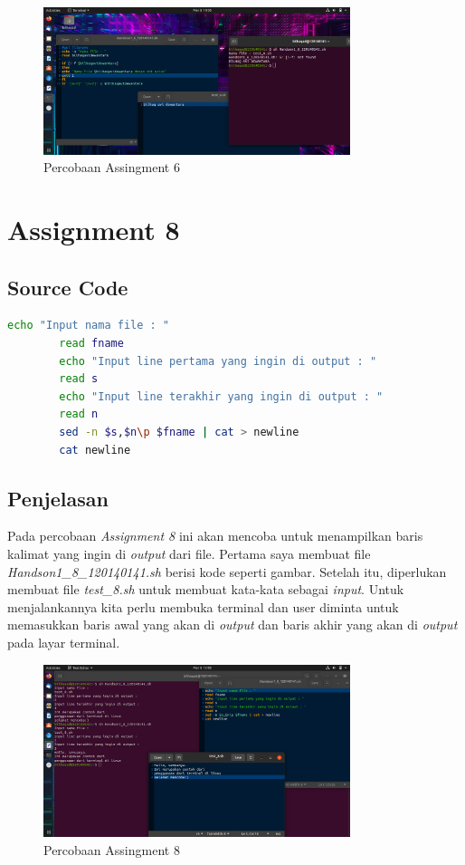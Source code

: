 \documentclass[11pt,a4paper]{article}
\begin{document}
	\begin{figure}[h]
		\centering
		\includegraphics[width=0.8\textwidth]{Figure/assign 6.png}
		\caption{Percobaan Assingment 6}
	\end{figure}
	
\section{Assignment 8}
\subsection*{Source Code}
\begin{lstlisting}[language=bash]
		echo "Input nama file : "
		read fname
		echo "Input line pertama yang ingin di output : "
		read s
		echo "Input line terakhir yang ingin di output : "
		read n
		sed -n $s,$n\p $fname | cat > newline
		cat newline
\end{lstlisting}

\subsection*{Penjelasan}
	Pada percobaan \textit{Assignment 8} ini akan mencoba untuk menampilkan baris kalimat yang ingin di \textit{output} dari file.
	Pertama saya membuat file \textit{Handson1\_8\_120140141.sh} berisi kode seperti gambar. Setelah itu, diperlukan membuat file \textit{test\_8.sh}
	untuk membuat kata-kata sebagai \textit{input}. Untuk menjalankannya kita perlu membuka terminal dan user diminta untuk memasukkan 
	baris awal yang akan di \textit{output} dan baris akhir yang akan di \textit{output} pada layar terminal.
	\begin{figure}
		\centering
		\includegraphics[width=0.8\textwidth]{Figure/assign 8.png}
		\caption{Percobaan Assingment 8}
	\end{figure}
\end{document}
